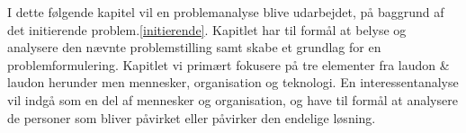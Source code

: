 I dette følgende kapitel vil en problemanalyse blive udarbejdet, på baggrund af det initierende problem.\ref{initierende}. Kapitlet har til formål at belyse og analysere den nævnte problemstilling samt skabe et grundlag for en problemformulering. Kapitlet vi primært fokusere på tre elementer fra laudon \& laudon herunder men mennesker, organisation og teknologi. En interessentanalyse vil indgå som en del af mennesker og organisation, og have til formål at analysere de personer som bliver påvirket eller påvirker den endelige løsning. 
